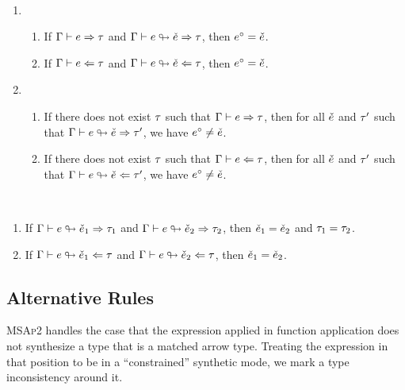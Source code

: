 \documentclass{article}
\begin{document}
\begin{theorem}[name=Marking of Well-Typed/Ill-Typed Expressions] \
  \begin{enumerate}
    \item \begin{enumerate}
        \item If $\Gamma \vdash e \Rightarrow \tau$ and $\Gamma \vdash e \looparrowright \check{e} \Rightarrow \tau$,
          then $e^{\circ} = \check{e}$.
        \item If $\Gamma \vdash e \Leftarrow \tau$ and $\Gamma \vdash e \looparrowright \check{e} \Leftarrow \tau$,
          then $e^{\circ} = \check{e}$.
      \end{enumerate}

    \item \begin{enumerate}
        \item If there does not exist $\tau$ such that $\Gamma \vdash e \Rightarrow \tau$, then for all
          $\check{e}$ and $\tau'$ such that $\Gamma \vdash e \looparrowright \check{e} \Rightarrow \tau'$, we have
          $e^{\circ} \neq \check{e}$.
        \item If there does not exist $\tau$ such that $\Gamma \vdash e \Leftarrow \tau$, then for all
          $\check{e}$ and $\tau'$ such that $\Gamma \vdash e \looparrowright \check{e} \Leftarrow \tau'$, we have
          $e^{\circ} \neq \check{e}$.
      \end{enumerate}
  \end{enumerate}
\end{theorem}

\begin{theorem}[name=Marking Unicity] \
  \begin{enumerate}
    \item If $\Gamma \vdash e \looparrowright \check{e}_1 \Rightarrow \tau_1$ and
      $\Gamma \vdash e \looparrowright \check{e}_2 \Rightarrow \tau_2$, then $\check{e}_1 = \check{e}_2$ and $\tau_1 =
      \tau_2$.
    \item If $\Gamma \vdash e \looparrowright \check{e}_1 \Leftarrow \tau$ and
      $\Gamma \vdash e \looparrowright \check{e}_2 \Leftarrow \tau$, then $\check{e}_1 = \check{e}_2$.
  \end{enumerate}
\end{theorem}

\subsection{Alternative Rules}
\textsc{MSAp2} handles the case that the expression applied in function application does not
synthesize a type that is a matched arrow type. Treating the expression in that position to be in a
``constrained'' synthetic mode, we mark a type inconsistency around it.
\end{document}
